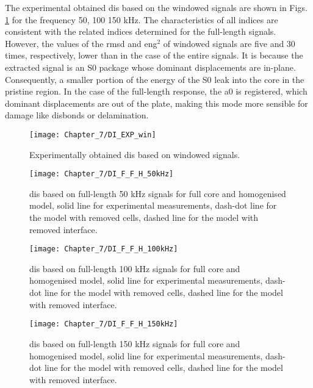 The experimental obtained \acp{di} based on the windowed signals are shown in Figs. \ref{fig:DI_exp_win} for the frequency 50, 100 150 kHz.
The characteristics of all indices are consistent with the related indices determined for the full-length signals.
However, the values of the \ac{rmsd} and \ac{eng}\(^2\) of windowed signals are five and 30 times, respectively, lower than in the case of the entire signals. It is because the extracted signal is an S0 package whose dominant displacements are in-plane.
Consequently, a smaller portion of the energy of the S0 leak into the core in the pristine region. In the case of the full-length response, the \ac{a0} is registered, which dominant displacements are out of the plate, making this mode more sensible for damage like disbonds or delamination.
\begin{figure}[!tbh]
	\begin{center}
		\texttt{[image: Chapter\_7/DI\_EXP\_win]}
	\end{center}
	\caption{Experimentally obtained \acp{di} based on windowed signals.}
	\label{fig:DI_exp_win}
\end{figure}
\begin{figure}[!tbh]
	\begin{center}
		\texttt{[image: Chapter\_7/DI\_F\_F\_H\_50kHz]}
	\end{center}
	\caption{\acp{di} based on full-length 50 kHz signals for full core and homogenised model, solid line for experimental measurements, dash-dot line for the model with removed cells, dashed line for the model with removed interface.}
	\label{fig:DI_num_full_50}
\end{figure}
\begin{figure}[!tbh]
	\begin{center}
		\texttt{[image: Chapter\_7/DI\_F\_F\_H\_100kHz]}
	\end{center}
	\caption{\acp{di} based on full-length 100 kHz signals for full core and homogenised model, solid line for experimental measurements, dash-dot line for the model with removed cells, dashed line for the model with removed interface.}
	\label{fig:DI_num_full_100}
\end{figure}
\begin{figure}[!tbh]
	\begin{center}
		\texttt{[image: Chapter\_7/DI\_F\_F\_H\_150kHz]}
	\end{center}
	\caption{\acp{di} based on full-length 150 kHz signals for full core and homogenised model, solid line for experimental measurements, dash-dot line for the model with removed cells, dashed line for the model with removed interface.}
	\label{fig:DI_num_full_150}
\end{figure}
